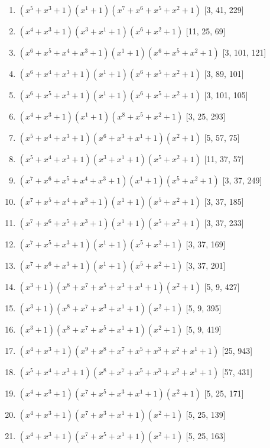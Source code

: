 \documentclass[10pt,twocolumn]{article}
\begin{document}
\begin{enumerate}
\item $(x^{5} + x^{3} + 1)(x^{1} + 1)(x^{7} + x^{6} + x^{5} + x^{2} + 1)$  [3, 41, 229]
\item $(x^{4} + x^{3} + 1)(x^{3} + x^{1} + 1)(x^{6} + x^{2} + 1)$  [11, 25, 69]
\item $(x^{6} + x^{5} + x^{4} + x^{3} + 1)(x^{1} + 1)(x^{6} + x^{5} + x^{2} + 1)$  [3, 101, 121]
\item $(x^{6} + x^{4} + x^{3} + 1)(x^{1} + 1)(x^{6} + x^{5} + x^{2} + 1)$  [3, 89, 101]
\item $(x^{6} + x^{5} + x^{3} + 1)(x^{1} + 1)(x^{6} + x^{5} + x^{2} + 1)$  [3, 101, 105]
\item $(x^{4} + x^{3} + 1)(x^{1} + 1)(x^{8} + x^{5} + x^{2} + 1)$  [3, 25, 293]
\item $(x^{5} + x^{4} + x^{3} + 1)(x^{6} + x^{3} + x^{1} + 1)(x^{2} + 1)$  [5, 57, 75]
\item $(x^{5} + x^{4} + x^{3} + 1)(x^{3} + x^{1} + 1)(x^{5} + x^{2} + 1)$  [11, 37, 57]
\item $(x^{7} + x^{6} + x^{5} + x^{4} + x^{3} + 1)(x^{1} + 1)(x^{5} + x^{2} + 1)$  [3, 37, 249]
\item $(x^{7} + x^{5} + x^{4} + x^{3} + 1)(x^{1} + 1)(x^{5} + x^{2} + 1)$  [3, 37, 185]
\item $(x^{7} + x^{6} + x^{5} + x^{3} + 1)(x^{1} + 1)(x^{5} + x^{2} + 1)$  [3, 37, 233]
\item $(x^{7} + x^{5} + x^{3} + 1)(x^{1} + 1)(x^{5} + x^{2} + 1)$  [3, 37, 169]
\item $(x^{7} + x^{6} + x^{3} + 1)(x^{1} + 1)(x^{5} + x^{2} + 1)$  [3, 37, 201]
\item $(x^{3} + 1)(x^{8} + x^{7} + x^{5} + x^{3} + x^{1} + 1)(x^{2} + 1)$  [5, 9, 427]
\item $(x^{3} + 1)(x^{8} + x^{7} + x^{3} + x^{1} + 1)(x^{2} + 1)$  [5, 9, 395]
\item $(x^{3} + 1)(x^{8} + x^{7} + x^{5} + x^{1} + 1)(x^{2} + 1)$  [5, 9, 419]
\item $(x^{4} + x^{3} + 1)(x^{9} + x^{8} + x^{7} + x^{5} + x^{3} + x^{2} + x^{1} + 1)$  [25, 943]
\item $(x^{5} + x^{4} + x^{3} + 1)(x^{8} + x^{7} + x^{5} + x^{3} + x^{2} + x^{1} + 1)$  [57, 431]
\item $(x^{4} + x^{3} + 1)(x^{7} + x^{5} + x^{3} + x^{1} + 1)(x^{2} + 1)$  [5, 25, 171]
\item $(x^{4} + x^{3} + 1)(x^{7} + x^{3} + x^{1} + 1)(x^{2} + 1)$  [5, 25, 139]
\item $(x^{4} + x^{3} + 1)(x^{7} + x^{5} + x^{1} + 1)(x^{2} + 1)$  [5, 25, 163]

\end{enumerate}
\end{document}

